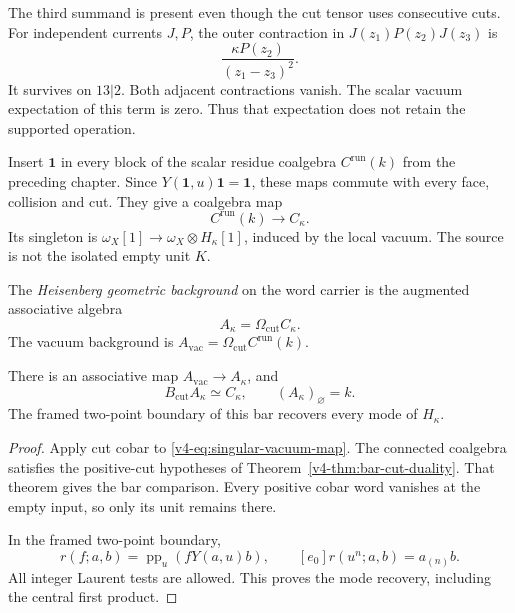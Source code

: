 The third summand is present even though the cut tensor uses consecutive
cuts. For independent currents \(J,P\), the outer
contraction in \(J(z_1)P(z_2)J(z_3)\) is
\[
                  \frac{\kappa P(z_2)}{(z_1-z_3)^2}.
\]
It survives on \(13|2\). Both adjacent contractions
vanish. The scalar vacuum expectation of this term
is zero. Thus that expectation does not retain the
supported operation.

Insert \(\mathbf1\) in every block of the scalar
residue coalgebra \(C^{\mathrm{run}}(k)\) from the
preceding chapter. Since \(Y(\mathbf1,u)\mathbf1=\mathbf1\),
these maps commute with every face, collision and cut.
They give a coalgebra map
\begin{equation}\label{v4-eq:singular-vacuum-map}
                    C^{\mathrm{run}}(k)\longrightarrow C_\kappa.
\end{equation}
Its singleton is \(\omega_X[1]\to
\omega_X\otimes H_\kappa[1]\), induced by the local
vacuum. The source is not the isolated empty unit \(K\).

\begin{definition}\label{v4-def:singular-background}
The \emph{Heisenberg geometric background} on the word
carrier is the augmented associative algebra
\[
                 A_\kappa=\Omega_{\mathrm{cut}}C_\kappa.
\]
The vacuum background is
\(A_{\mathrm{vac}}=\Omega_{\mathrm{cut}}C^{\mathrm{run}}(k)\).
\end{definition}

\begin{corollary}\label{v4-cor:singular-background-comparison}
There is an associative map
\(A_{\mathrm{vac}}\to A_\kappa\), and
\[
 B_{\mathrm{cut}}A_\kappa\simeq C_\kappa,
 \qquad (A_\kappa)_\varnothing=k.
\]
The framed two-point boundary of this bar recovers
every mode of \(H_\kappa\).
\end{corollary}

\begin{proof}
Apply cut cobar to \eqref{v4-eq:singular-vacuum-map}.
The connected coalgebra satisfies the positive-cut
hypotheses of Theorem~\ref{v4-thm:bar-cut-duality}.
That theorem gives the bar comparison. Every positive
cobar word vanishes at the empty input, so only its
unit remains there.

In the framed two-point boundary,
\[
 r(f;a,b)=\operatorname{pp}_u(fY(a,u)b),
 \qquad [e_0]r(u^n;a,b)=a_{(n)}b.
\]
All integer Laurent tests are allowed. This proves
the mode recovery, including the central first product.
\end{proof}

